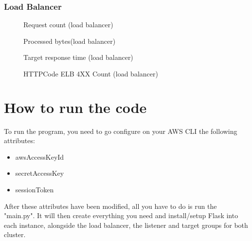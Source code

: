 \documentclass[12pt]{article}
\begin{document}
        
        \subsubsection{Load Balancer}
            \begin{figure}[htpb]
                \centering
                    \caption{Request count (load balancer)}
                    \label{fig:requescountelb}
                \end{figure}
                \begin{figure}[htpb]
                \centering
                    \caption{Processed bytes(load balancer)}
                    \label{fig:procbyteselb}
                \end{figure}

            \begin{figure}[htpb]
                \centering
                    \caption{Target response time (load balancer)}
                    \label{fig:targetresponsetimeelb}
                \end{figure}
        \begin{figure}[htpb]
                \centering
                    \caption{HTTPCode ELB 4XX Count (load balancer)}
                    \label{fig:httpelb}
                \end{figure}
           
           


                            
        




	\pagebreak


\section{How to run the code} \label{sec:runcode}
	\paragraph{} To run the program, you need to go configure on your AWS CLI the following attributes:
	\begin{itemize}
      \item awsAccessKeyId
      \item secretAccessKey
      \item sessionToken
    \end{itemize}
    After these attributes have been modified, all you have to do is run the "main.py". It will then
	create everything you need and install/setup Flask into each instance, alongside the load balancer, the listener and target groups for both cluster. 
	
\end{document}
